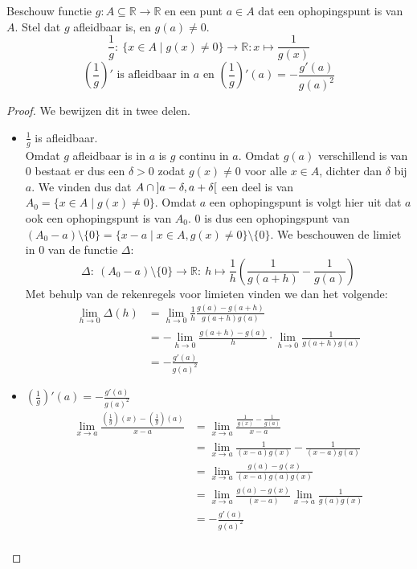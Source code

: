 \documentclass[main.tex]{subfiles}
\begin{document}
\begin{pr}
  Beschouw functie $g: A \subseteq \mathbb{R} \rightarrow \mathbb{R}$ en een punt $a\in A$ dat een ophopingspunt is van $A$.
  Stel dat $g$ afleidbaar is, en $g(a) \neq 0$.
  \[ \frac{1}{g}:\ \{ x \in A \mid g(x) \neq 0\} \rightarrow \mathbb{R}: x \mapsto \frac{1}{g(x)} \]
  \[ \left(\frac{1}{g}\right)' \text{ is afleidbaar in } a \text{ en } \left(\frac{1}{g}\right)'(a) = -\frac{g'(a)}{g(a)^{2}} \]

  \begin{proof}
    We bewijzen dit in twee delen.
    \begin{itemize}
    \item $\frac{1}{g}$ is afleidbaar.\\
      Omdat $g$ afleidbaar is in $a$ is $g$ continu in $a$.
      Omdat $g(a)$ verschillend is van $0$ bestaat er dus een $\delta > 0$ zodat $g(x) \neq 0$ voor alle $x\in A$, dichter dan $\delta$ bij $a$.\waarom
      We vinden dus dat $A \cap \interval[open]{a-\delta}{a+\delta}$ een deel is van $A_{0} = \{ x \in A \mid g(x) \neq 0\}$.
      Omdat $a$ een ophopingspunt is volgt hier uit dat $a$ ook een ophopingspunt is van $A_{0}$.\waarom
      $0$ is dus een ophopingspunt van $(A_{0}-a) \setminus \{0\}= \{ x-a \mid x \in A, g(x) \neq 0\} \setminus \{0\}$.
      We beschouwen de limiet in $0$ van de functie $\Delta$:
      \[ \Delta:\ (A_{0}-a) \setminus \{0\} \rightarrow \mathbb{R}:\ h \mapsto \frac{1}{h}\left(\frac{1}{g(a+h)}-\frac{1}{g(a)} \right) \]
      Met behulp van de rekenregels voor limieten vinden we dan het volgende:
      \[
      \begin{array}{rl}
        \lim_{h \rightarrow 0}\Delta(h)
        &= \lim_{h \rightarrow 0}\frac{1}{h} \frac{g(a)-g(a+h)}{g(a+h)g(a)}\\
        &= -\lim_{h \rightarrow 0}\frac{g(a+h)-g(a)}{h} \cdot \lim_{h\rightarrow 0}\frac{1}{g(a+h)g(a)}\\
        &= -\frac{g'(a)}{g(a)^{2}}
      \end{array}
      \]
    \item $\left(\frac{1}{g}\right)'(a) = -\frac{g'(a)}{g(a)^{2}}$\\
      \[
      \begin{array}{rl}
        \lim_{x \rightarrow a}\frac{\left(\frac{1}{g}\right)(x)-\left(\frac{1}{g}\right)(a)}{x-a}
        &= \lim_{x \rightarrow a}\frac{\frac{1}{g(x)}-\frac{1}{g(a)} }{x-a}\\
        &= \lim_{x \rightarrow a}\frac{1}{(x-a)g(x)}-\frac{1}{(x-a)g(a)}\\
        &= \lim_{x \rightarrow a}\frac{g(a)-g(x)}{(x-a)g(a)g(x)}\\
        &= \lim_{x \rightarrow a}\frac{g(a)-g(x)}{(x-a)}\lim_{x\rightarrow a}\frac{1}{g(a)g(x)}\\
        &= -\frac{g'(a)}{g(a)^{2}}\\
      \end{array}
      \]
    \end{itemize}
  \end{proof}
\end{pr}
\end{document}
